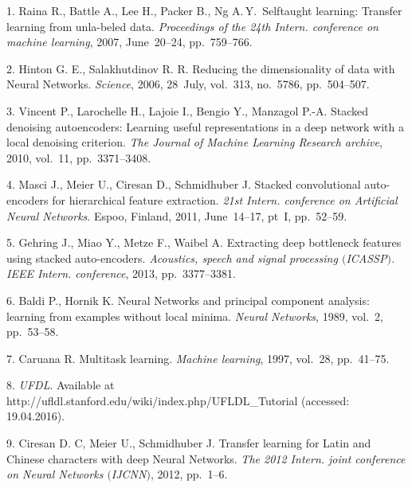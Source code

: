


{\footnotesize

\vskip 4mm


\vskip 4mm


1. Raina R., Battle A., Lee H., Packer B.,  Ng A.\,Y.\, Selftaught
learning: Transfer learning from unla-\linebreak beled data.
\textit{Proceedings of the 24th Intern. conference on machine
learning}, 2007, June~20--24, pp.~759--766.

2. Hinton G. E., Salakhutdinov R. R. Reducing the dimensionality
of data with Neural Networks. \textit{Science}, 2006, 28~July,
vol.~313, no.~5786, pp.~504--507.

3. Vincent P., Larochelle H., Lajoie I., Bengio Y., Manzagol P.-A.
Stacked denoising autoencoders: Learning useful representations in
a deep network with a local denoising criterion. \textit{The
Journal of Machine Learning Research archive}, 2010, vol.~11,
pp.~3371--3408.

4. Masci J., Meier U., Ciresan D., Schmidhuber J. Stacked
convolutional auto-encoders for hierarchical feature extraction.
\textit{21st Intern. conference on Artificial Neural Networks}.
Espoo, Finland, 2011, June~14--17, pt~I, pp.~52--59.

5. Gehring J., Miao Y., Metze F., Waibel A. Extracting deep
bottleneck features using stacked auto-encoders.
\textit{Acoustics, speech and signal processing $($ICASSP$)$. IEEE
Intern. conference}, 2013,  pp.~3377--3381.

6. Baldi P., Hornik K. Neural Networks and principal component
analysis: learning from examples without local minima.
\textit{Neural Networks}, 1989, vol.~2, pp.~53--58.

7. Caruana R. Multitask learning. \textit{Machine learning}, 1997,
vol.~28, pp.~41--75.

8. \textit{UFDL}. Available at
http://ufldl.stanford.edu/wiki/index.php/UFLDL\_Tutorial
(accessed: 19.04.2016).

9. Ciresan D. C, Meier U., Schmidhuber J. Transfer learning for
Latin and Chinese characters with deep Neural Networks.
\textit{The 2012 Intern. joint conference on Neural Networks
$($IJCNN$)$}, 2012, pp.~1--6.

}
